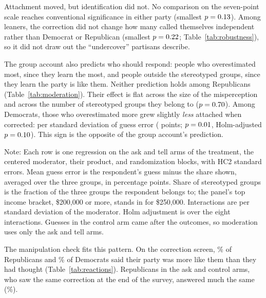 \documentclass[11pt]{article}
\newcommand{\TableStyle}{\small\setlength{\tabcolsep}{5pt}\renewcommand{\arraystretch}{1.05}}
\begin{document}
Attachment moved, but identification did not. No comparison on the seven-point scale reaches conventional significance in either party (smallest $p = 0.13$). Among leaners, the correction did not change how many called themselves independent rather than Democrat or Republican (smallest $p = 0.22$; Table~\ref{tab:robustness}), so it did not draw out the ``undercover'' partisans \citet{klar2016} describe.

The group account also predicts who should respond: people who overestimated most, since they learn the most, and people outside the stereotyped groups, since they learn the party is like them. Neither prediction holds among Republicans (Table~\ref{tab:moderation}). Their effect is flat across the size of the misperception and across the number of stereotyped groups they belong to ($p = 0.70$). Among Democrats, those who overestimated more grew slightly \emph{less} attached when corrected: \demErrorInteraction{} per standard deviation of guess error (\demErrorSD{} points; $p = 0.01$, Holm-adjusted $p = 0.10$). This sign is the opposite of the group account's prediction.

\begin{table}[H]
\centering
\caption{Moderation of the information effect (tell vs.\ ask)}
\label{tab:moderation}
{\TableStyle{}}
\par\smallskip
\begin{minipage}{0.95\linewidth}\footnotesize
Note: Each row is one regression on the ask and tell arms of the treatment, the centered moderator, their product, and randomization blocks, with HC2 standard errors. Mean guess error is the respondent's guess minus the share shown, averaged over the three groups, in percentage points. Share of stereotyped groups is the fraction of the three groups the respondent belongs to; the panel's top income bracket, \$200,000 or more, stands in for \$250,000. Interactions are per standard deviation of the moderator. Holm adjustment is over the eight interactions. Guesses in the control arm came after the outcomes, so moderation uses only the ask and tell arms.
\end{minipage}
\end{table}

The manipulation check fits this pattern. On the correction screen, \moreLikeRep\% of Republicans and \moreLikeDem\% of Democrats said their party was more like them than they had thought (Table~\ref{tab:reactions}). Republicans in the ask and control arms, who saw the same correction at the end of the survey, answered much the same (\moreLikeDebriefRep\%).
\end{document}

